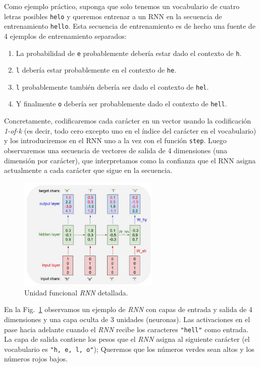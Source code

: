 \documentclass[a4paper,12pt]{article}
\begin{document}
Como ejemplo práctico, suponga que solo tenemos un vocabulario de cuatro letras posibles \texttt{helo} y queremos entrenar a un RNN en la secuencia de entrenamiento \texttt{hello}. Esta secuencia de entrenamiento es de hecho una fuente de 4 ejemplos de entrenamiento separados: 
\begin{enumerate}
	\item La probabilidad de \texttt{e} probablemente debería estar dado el contexto de \texttt{h}.
	\item \texttt{l} debería estar probablemente en el contexto de \texttt{he}.
	\item \texttt{l} probablemente también debería ser dado el contexto de \texttt{hel}.
	\item  Y finalmente \texttt{o} debería ser probablemente dado el contexto de \texttt{hell}.
\end{enumerate}

Concretamente, codificaremos cada carácter en un vector usando la codificación \textit{1-of-k} (es decir, todo cero excepto uno en el índice del carácter en el vocabulario) y los introduciremos en el RNN uno a la vez con el función \texttt{step}. Luego observaremos una secuencia de vectores de salida de 4 dimensiones (una dimensión por carácter), que interpretamos como la confianza que el RNN asigna actualmente a cada carácter que sigue en la secuencia. 

\begin{figure}[H]
	\begin{center}				
	\includegraphics[width=0.6\textwidth]{tesis_29.png}
  	\caption{Unidad funcional \textit{RNN} detallada.}
  	\label{fig:rnnexample}
  	\end{center}
\end{figure}

En la Fig.~\ref{fig:rnnexample} observamos un ejemplo de \textit{RNN} con capas de entrada y salida de 4 dimensiones y una capa oculta de 3 unidades (neuronas). Las activaciones en el pase hacia adelante cuando el \textit{RNN} recibe los caracteres \texttt{"hell"} como entrada. La capa de salida contiene los pesos que el \textit{RNN} asigna al siguiente carácter (el vocabulario es \texttt{"h, e, l, o"}); Queremos que los números verdes sean altos y los números rojos bajos.
\end{document}
